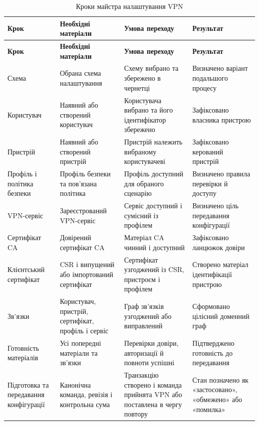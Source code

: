 \documentclass{article}
\begin{document}
\begin{longtable}{p{2.6cm}p{4.0cm}p{4.2cm}p{3.0cm}}
\caption{Кроки майстра налаштування VPN}\label{tab:wizard-steps}\\
\toprule
\textbf{Крок} & \textbf{Необхідні матеріали} & \textbf{Умова переходу} & \textbf{Результат} \\
\midrule
\endfirsthead
\toprule
\textbf{Крок} & \textbf{Необхідні матеріали} & \textbf{Умова переходу} & \textbf{Результат} \\
\midrule
\endhead
Схема & Обрана схема налаштування & Схему вибрано та збережено в чернетці & Визначено варіант подальшого процесу \\
Користувач & Наявний або створений користувач & Користувача вибрано та його ідентифікатор збережено & Зафіксовано власника пристрою \\
Пристрій & Наявний або створений пристрій & Пристрій належить вибраному користувачеві & Зафіксовано керований пристрій \\
Профіль і політика безпеки & Профіль безпеки та пов'язана політика & Профіль доступний для обраного сценарію & Визначено правила перевірки й доступу \\
VPN-сервіс & Зареєстрований VPN-сервіс & Сервіс доступний і сумісний із профілем & Визначено ціль передавання конфігурації \\
Сертифікат CA & Довірений сертифікат CA & Матеріал CA чинний і доступний & Зафіксовано ланцюжок довіри \\
Клієнтський сертифікат & CSR і випущений або імпортований сертифікат & Сертифікат узгоджений із CSR, пристроєм і профілем & Створено матеріал ідентифікації пристрою \\
Зв'язки & Користувач, пристрій, сертифікат, профіль і сервіс & Граф зв'язків узгоджений або виправлений & Сформовано цілісний доменний граф \\
Готовність матеріалів & Усі попередні матеріали та зв'язки & Перевірки довіри, авторизації й повноти успішні & Підтверджено готовність до передавання \\
Підготовка та передавання конфігурації & Канонічна команда, ревізія і контрольна сума & Транзакцію створено і команда прийнята VPN або поставлена в чергу повтору & Стан позначено як «застосовано», «обмежено» або «помилка» \\
\bottomrule
\end{longtable}
\end{document}
